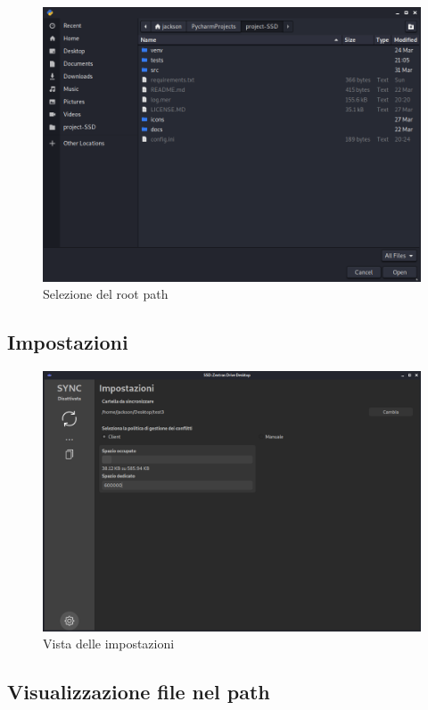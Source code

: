 \begin{figure}[H]
    \centering
    \includegraphics[scale = 0.30]{components/img/selezione-path.png}
    \caption{Selezione del root path}
    \label{fig:Selezione del root path}
\end{figure}

\subsection{Impostazioni}
\begin{figure}[H]
    \centering
    \includegraphics[scale = 0.30]{components/img/settings.png}
    \caption{Vista delle impostazioni}
    \label{fig:Vista delle impostazioni}
\end{figure}


\subsection{Visualizzazione file nel path}

